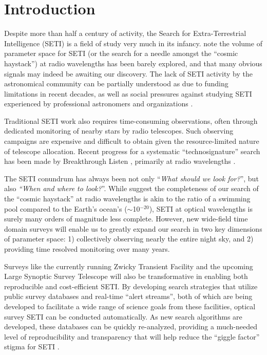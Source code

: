 \documentclass[modern]{aastex62}
\begin{document}
\section{Introduction}

Despite more than half a century of activity, the Search for Extra-Terrestrial Intelligence (SETI) is a field of study very much in its infancy. 
\citet{wright2018c} note the volume of parameter space for SETI (or the search for a needle amongst the ``cosmic haystack'') at radio wavelengths has been barely explored, and that many obvious signals may indeed be awaiting our discovery. 
The lack of SETI activity by the astronomical community can be partially understood as due to funding limitations in recent decades, as well as social pressures against studying SETI experienced by professional astronomers and organizations \citep{wright2018b}. 

Traditional SETI work also requires time-consuming observations, often through dedicated monitoring of nearby stars by radio telescopes. Such observing campaigns are expensive and difficult to obtain given the resource-limited nature of telescope allocation. Recent progress for a systematic ``technosignature'' search has been made by Breakthrough Listen \citep{worden2017,isaacson2017}, primarily at radio wavelengths \citep[e.g.][]{price2018}. 


The SETI conundrum has always been not only ``{\it What should we look for?}'', but  also {\it ``When and where to look?}''. 
While \citet{wright2018c} suggest the completeness of our search of the ``cosmic haystack'' at radio wavelengths is akin to the ratio of a swimming pool compared to the Earth's ocean's ($\sim$10$^{-20}$), SETI at optical wavelengths is surely many orders of magnitude less complete. However, new wide-field time domain surveys will enable us to greatly expand our search in two key dimensions of parameter space: 1) collectively observing nearly the entire night sky, and 2) providing time resolved monitoring over many years. 


Surveys like the currently running Zwicky Transient Facility \citep[ZTF][]{bellm2014} and the upcoming Large Synoptic Survey Telescope \citep[LSST][]{lsst} will also be transformative in enabling both reproducible and cost-efficient SETI. By developing search strategies that utilize public survey databases and real-time ``alert streams'', both of which are being developed to facilitate a wide range of science goals from these facilities, optical survey SETI can be conducted automatically. As new search algorithms are developed, these databases can be quickly re-analyzed, providing a much-needed level of reproducibility and transparency that will help reduce the ``giggle factor'' stigma for SETI \citep{wright2018b}.
\end{document}
